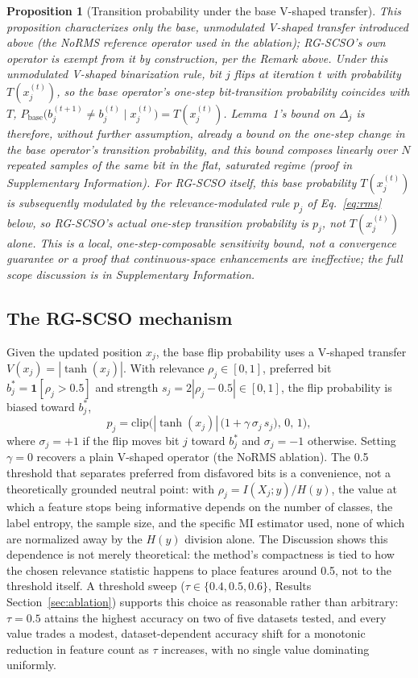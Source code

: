 \documentclass[iicol,sn-basic,pdflatex]{sn-jnl}
\newtheorem{proposition}[lemma]{Proposition}
\begin{document}
\begin{proposition}[Transition probability under the base V-shaped transfer]
This proposition characterizes only the base, unmodulated V-shaped transfer
introduced above (the NoRMS reference operator used in the ablation);
RG-SCSO's own operator is exempt from it by construction, per the Remark
above. Under this unmodulated V-shaped binarization rule, bit $j$
flips at iteration $t$ with probability $T(x_j^{(t)})$, so the base
operator's one-step bit-transition probability coincides with $T$,
$P_{\text{base}}\big(b_j^{(t+1)}\ne b_j^{(t)}\mid x_j^{(t)}\big)=T(x_j^{(t)})$.
Lemma~1's
bound on $\Delta_j$ is therefore, without further assumption, already a
bound on the one-step change in the base operator's transition probability,
and this bound
composes linearly over $N$ repeated samples of the same bit in the flat,
saturated regime (proof in Supplementary Information). For RG-SCSO itself,
this base probability $T(x_j^{(t)})$ is subsequently modulated by the
relevance-modulated rule $p_j$ of Eq.~\ref{eq:rms} below, so RG-SCSO's
actual one-step transition probability is $p_j$, not $T(x_j^{(t)})$ alone.
This is a local,
one-step-composable sensitivity bound, not a convergence guarantee or a
proof that continuous-space enhancements are ineffective; the full scope
discussion is in Supplementary Information.
\end{proposition}

\subsection{The RG-SCSO mechanism}
Given the updated position $x_j$, the base flip probability uses a V-shaped
transfer $V(x_j)=|\tanh(x_j)|$. With relevance $\rho_j\in[0,1]$, preferred bit
$b^\ast_j=\mathbf{1}[\rho_j>0.5]$ and strength $s_j=2|\rho_j-0.5|\in[0,1]$,
the flip probability is biased toward $b^\ast_j$,
\begin{equation}
  p_j = \mathrm{clip}\!\Big(|\tanh(x_j)|\,\big(1+\gamma\,\sigma_j\,s_j\big),\,0,\,1\Big),
  \label{eq:rms}
\end{equation}
where $\sigma_j=+1$ if the flip moves bit $j$ toward $b^\ast_j$ and $\sigma_j=-1$
otherwise. Setting $\gamma=0$ recovers a plain V-shaped operator (the NoRMS
ablation). The 0.5 threshold that separates preferred from disfavored bits is
a convenience, not a theoretically grounded neutral point: with
$\rho_j=I(X_j;y)/H(y)$, the value at which a feature stops being informative
depends on the number of classes, the label entropy, the sample size, and
the specific MI estimator used, none of which are normalized away by the
$H(y)$ division alone. The Discussion shows this dependence is not merely
theoretical: the method's compactness is tied to how the chosen relevance
statistic happens to place features around 0.5, not to the threshold
itself. A threshold sweep ($\tau\in\{0.4,0.5,0.6\}$, Results
Section~\ref{sec:ablation}) supports this choice as reasonable rather than
arbitrary: $\tau=0.5$ attains the highest accuracy on two of five datasets
tested, and every value trades a modest, dataset-dependent accuracy shift
for a monotonic reduction in feature count as $\tau$ increases, with no
single value dominating uniformly.
\end{document}
